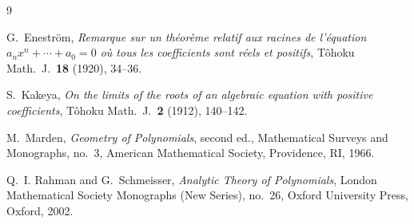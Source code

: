 \documentclass[11pt]{amsart}
\theoremstyle{plain}
\theoremstyle{definition}
\theoremstyle{remark}
\begin{document}
\begin{thebibliography}{9}

G.~Enestr\"om,
\emph{Remarque sur un th\'eor\`eme relatif aux racines de l'\'equation
$a_nx^{n}+\cdots+a_0=0$ o\`u tous les coefficients sont r\'eels et positifs},
T\^ohoku Math.\ J.\ \textbf{18} (1920), 34--36.

S.~Kakeya,
\emph{On the limits of the roots of an algebraic equation with positive coefficients},
T\^ohoku Math.\ J.\ \textbf{2} (1912), 140--142.

M.~Marden,
\emph{Geometry of Polynomials}, second ed.,
Mathematical Surveys and Monographs, no.~3, American Mathematical Society, Providence, RI,
1966.

Q.~I. Rahman and G.~Schmeisser,
\emph{Analytic Theory of Polynomials},
London Mathematical Society Monographs (New Series), no.~26, Oxford University Press,
Oxford, 2002.

\end{thebibliography}
\end{document}
